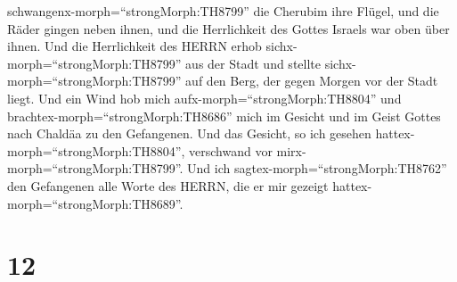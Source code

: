 schwangenx-morph=``strongMorph:TH8799'' die Cherubim ihre Flügel, und
die Räder gingen neben ihnen, und die Herrlichkeit des Gottes Israels
war oben über ihnen.  Und die Herrlichkeit des HERRN erhob
sichx-morph=``strongMorph:TH8799'' aus der Stadt und stellte
sichx-morph=``strongMorph:TH8799'' auf den Berg, der gegen Morgen vor
der Stadt liegt.  Und ein Wind hob mich
aufx-morph=``strongMorph:TH8804'' und
brachtex-morph=``strongMorph:TH8686'' mich im Gesicht und im Geist
Gottes nach Chaldäa zu den Gefangenen. Und das Gesicht, so ich gesehen
hattex-morph=``strongMorph:TH8804'', verschwand vor
mirx-morph=``strongMorph:TH8799''.  Und ich
sagtex-morph=``strongMorph:TH8762'' den Gefangenen alle Worte des HERRN,
die er mir gezeigt hattex-morph=``strongMorph:TH8689''.

\hypertarget{section-11}{%
\section{12}\label{section-11}}

